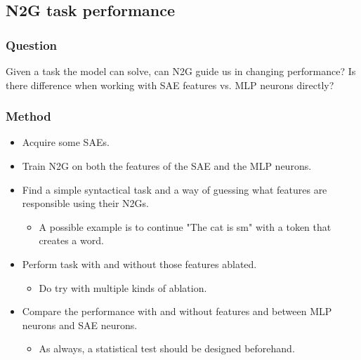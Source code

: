 \documentclass[../main.tex]{subfiles}
\begin{document}
\subsection{N2G task performance}
\subsubsection{Question}
Given a task the model can solve, can N2G guide us in changing performance? Is there difference when working with SAE features vs. MLP neurons directly?

\subsubsection{Method}
\begin{itemize}
    \item Acquire some SAEs.
    \item Train N2G on both the features of the SAE and the MLP neurons.
    \item Find a simple syntactical task and a way of guessing what features are responsible using their N2Gs.
    \begin{itemize}
        \item A possible example is to continue "The cat is sm" with a token that creates a word.
    \end{itemize}
    \item Perform task with and without those features ablated.
    \begin{itemize}
        \item Do try with multiple kinds of ablation.
    \end{itemize}
    \item Compare the performance with and without features and between MLP neurons and SAE neurons.
    \begin{itemize}
        \item As always, a statistical test should be designed beforehand.
    \end{itemize}
\end{itemize}
\end{document}
